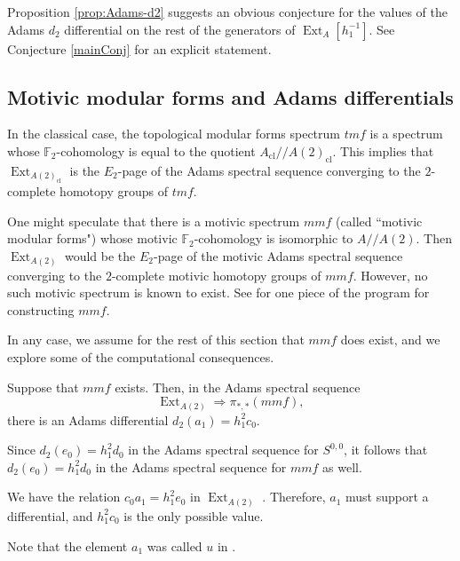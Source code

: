 \documentclass[10pt]{amsart}
\begin{document}
Proposition \ref{prop:Adams-d2} suggests an obvious conjecture for the
values of the Adams $d_2$ differential on the rest of the generators of
$\operatorname{Ext}_A[h_1^{-1}]$.  See Conjecture \ref{mainConj} for an explicit statement.

\subsection{Motivic modular forms and Adams differentials}
In the classical case, the topological modular forms spectrum ${\mathit{tmf}}$
is a spectrum whose ${\ensuremath{\mathbb{F}}}_2$-cohomology
is equal to the quotient $A_{\mathrm{cl}}//A(2)_{\mathrm{cl}}$.  This implies that 
$\operatorname{Ext}_{A(2)_{\mathrm{cl}}}$
is the $E_2$-page of the Adams spectral sequence converging to the 
$2$-complete homotopy groups of ${\mathit{tmf}}$.

One might speculate that there is a motivic spectrum ${\mathit{mmf}}$ (called
``motivic modular forms") whose motivic ${\ensuremath{\mathbb{F}}}_2$-cohomology is isomorphic
to $A//A(2)$.  Then $\operatorname{Ext}_{A(2)}$ would be the $E_2$-page of the motivic
Adams spectral sequence converging to the $2$-complete motivic
homotopy groups of ${\mathit{mmf}}$.  However, no such motivic spectrum is known 
to exist.  See \cite{NSO} for one piece of the program for constructing ${\mathit{mmf}}$.

In any case, we assume for the rest of this section that ${\mathit{mmf}}$ does exist,
and we explore some of the computational consequences.

\begin{lemma}
\label{lem:d2-a1}
Suppose that ${\mathit{mmf}}$ exists. Then, in the Adams spectral sequence 
\[
\operatorname{Ext}_{A(2)}\Rightarrow \pi_{*,*}({\mathit{mmf}}),
\]
there is an Adams differential $d_2(a_1)=h_1^2c_0$.
\end{lemma}

\begin{pf}
Since $d_2(e_0) = h_1^2 d_0$ in the Adams spectral sequence for $S^{0,0}$,
it follows that $d_2(e_0) = h_1^2 d_0$ in the Adams spectral sequence
for ${\mathit{mmf}}$ as well.

We have the relation $c_0 a_1 = h_1^2 e_0$ in $\operatorname{Ext}_{A(2)}$  \cite{IMotA(2)}.
Therefore, $a_1$ must support a differential, and
$h_1^2 c_0$ is the only possible value.

Note that the element $a_1$ was called $u$ in \cite{IMotA(2)}.
\end{pf}
\end{document}
